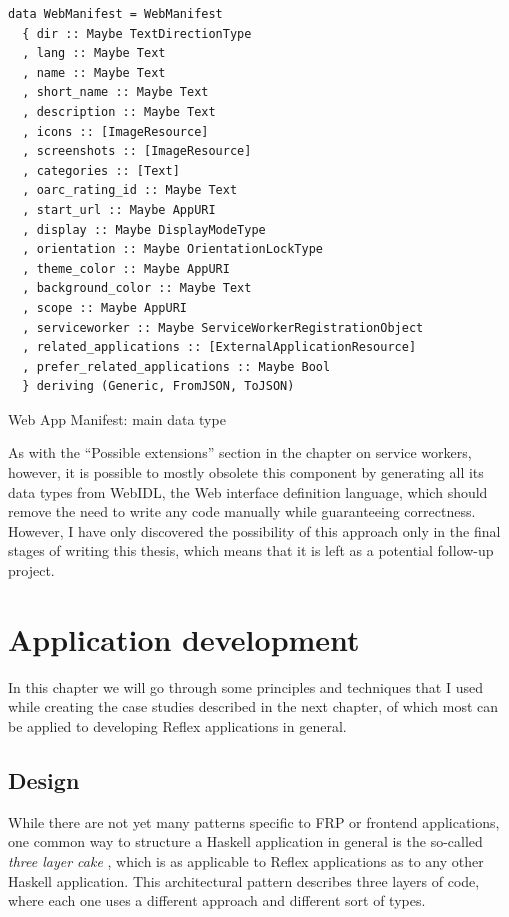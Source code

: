 \documentclass[english,zadani,odsaz]{fitthesis}
\begin{document}
\begin{listing}[tb]
\begin{verbatim}
data WebManifest = WebManifest
  { dir :: Maybe TextDirectionType
  , lang :: Maybe Text
  , name :: Maybe Text
  , short_name :: Maybe Text
  , description :: Maybe Text
  , icons :: [ImageResource]
  , screenshots :: [ImageResource]
  , categories :: [Text]
  , oarc_rating_id :: Maybe Text
  , start_url :: Maybe AppURI
  , display :: Maybe DisplayModeType
  , orientation :: Maybe OrientationLockType
  , theme_color :: Maybe AppURI
  , background_color :: Maybe Text
  , scope :: Maybe AppURI
  , serviceworker :: Maybe ServiceWorkerRegistrationObject
  , related_applications :: [ExternalApplicationResource]
  , prefer_related_applications :: Maybe Bool
  } deriving (Generic, FromJSON, ToJSON)
\end{verbatim}
\caption{Web App Manifest: main data type \label{manifest-type}}
\end{listing}

As with the ``Possible extensions'' section in the chapter on service workers,
however, it is possible to mostly obsolete this component by generating all its
data types from WebIDL, the Web interface definition language, which should
remove the need to write any code manually while guaranteeing correctness.
However, I have only discovered the possibility of this approach only in the
final stages of writing this thesis, which means that it is left as a potential
follow-up project.

\chapter{Application development}
\label{sec:org69ab61d}
In this chapter we will go through some principles and techniques that I used
while creating the case studies described in the next chapter, of which most can
be applied to developing Reflex applications in general.

\section{Design}
\label{sec:org417629c}
While there are not yet many patterns specific to FRP or frontend applications,
one common way to structure a Haskell application in general is the so-called
\emph{three layer cake} \cite{three-layer}, which is as applicable to Reflex applications as
to any other Haskell application. This architectural pattern describes three
layers of code, where each one uses a different approach and different sort of
types.
\end{document}
